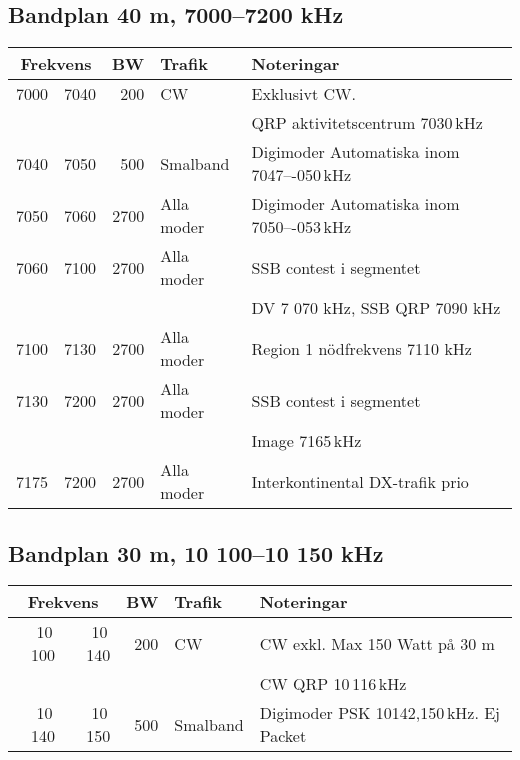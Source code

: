 \subsection{Bandplan 40 m, 7000--7200 kHz}
\begin{tabular}{rrrll}
\multicolumn{2}{c}{\textbf{Frekvens}} & \textbf{BW} & \textbf{Trafik} & \textbf{Noteringar} \\ \hline
7000 & 7040 & 200  & CW         & Exklusivt CW.                             \\
     &      &      &            & QRP aktivitetscentrum 7030\,kHz           \\ \hline
7040 & 7050 & 500  & Smalband   & Digimoder Automatiska inom 7047–-050\,kHz \\ \hline
7050 & 7060 & 2700 & Alla moder & Digimoder Automatiska inom 7050–-053\,kHz \\ \hline
7060 & 7100 & 2700 & Alla moder & SSB contest i segmentet                   \\
     &      &      &            & DV 7 070 kHz, SSB QRP 7090 kHz            \\ \hline
7100 & 7130 & 2700 & Alla moder & Region 1 nödfrekvens 7110 kHz             \\ \hline
7130 & 7200 & 2700 & Alla moder & SSB contest i segmentet                   \\
     &      &      &            & Image 7165\,kHz                           \\ \hline
7175 & 7200 & 2700 & Alla moder & Interkontinental DX-trafik prio           \\ \hline
\end{tabular}

\subsection{Bandplan 30 m, 10 100--10 150 kHz}
\begin{tabular}{rrrll}
\multicolumn{2}{c}{\textbf{Frekvens}} & \textbf{BW} & \textbf{Trafik} & \textbf{Noteringar} \\ \hline
10\,100 & 10\,140 & 200 & CW       & CW exkl. Max 150 Watt på 30 m           \\
        &         &     &          & CW QRP 10\,116\,kHz                     \\ \hline
10\,140 & 10\,150 & 500 & Smalband & Digimoder PSK 10142,150\,kHz. Ej Packet \\ \hline
\end{tabular}

